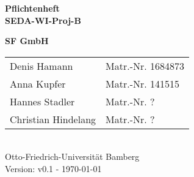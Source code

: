 \documentclass[pdftex, a4paper, 12pt]{article}
\begin{document}


\begin{titlepage}

{\sffamily
\vspace*{2cm}
\begin{center}
	\bfseries
	\LARGE {Pflichtenheft\\SEDA-WI-Proj-B}
\end{center}
\vspace{1cm}
\begin{center}

	{\Large\bfseries SF GmbH\\[5mm]}

	\begin{tabular}{ll}
		Denis Hamann & Matr.-Nr. 1684873 \\[3mm]

		Anna Kupfer & Matr.-Nr.  141515\\[3mm]

		Hannes Stadler & Matr.-Nr. ? \\[3mm]

		Christian Hindelang & Matr.-Nr. ? \\[3mm]


	\end{tabular}\\[0.5cm]
	
{\scriptsize Otto-Friedrich-Universität Bamberg} \\[21pt]


{\footnotesize Version: v0.1 - \today }



\end{center}
}
\end{titlepage}


\newpage

\textcolor{MidnightBlue}{\tableofcontents}

\textcolor{MidnightBlue}{\listoffigures}

\newpage

\newpage

\newpage

\newpage

\newpage

\newpage

\newpage

\newpage

\newpage

\newpage

\newpage

\newpage

\newpage
%
\end{document}
